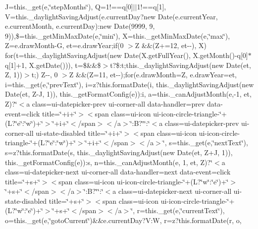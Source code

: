 {{\begin{DoxyParamCaption}
J=this.\+\_\+get(e,\char`\"{}step\+Months\char`\"{}), Q=1!==q\mbox{[}0\mbox{]}$\vert$$\vert$1!==q\mbox{[}1\mbox{]}, V=this.\+\_\+daylight\+Saving\+Adjust(e.\+current\+Day?new Date(e.\+current\+Year, e.\+current\+Month, e.\+current\+Day)\+:new Date(9999, 9, 9)),\$=this.\+\_\+get\+Min\+Max\+Date(e,\char`\"{}min\char`\"{}), X=this.\+\_\+get\+Min\+Max\+Date(e,\char`\"{}max\char`\"{}), Z=e.\+draw\+Month-\/\+G, et=e.\+draw\+Year;if(0 $>$\+Z \&\&(\+Z+=12, et-\/-\/), X) for(t=this.\+\_\+daylight\+Saving\+Adjust(new Date(\+X.\+get\+Full\+Year(), X.\+get\+Month()-\/q\mbox{[}0\mbox{]}$\ast$q\mbox{[}1\mbox{]}+1, X.\+get\+Date())), t=\$\&\&\$$>$t?\$\+:t;this.\+\_\+daylight\+Saving\+Adjust(new Date(et, Z, 1))$>$t;) Z-\/-\/, 0 $>$\+Z \&\&(\+Z=11, et-\/-\/);for(e.\+draw\+Month=\+Z, e.\+draw\+Year=et, i=this.\+\_\+get(e,\char`\"{}prev\+Text\char`\"{}), i=z?this.\+format\+Date(i, this.\+\_\+daylight\+Saving\+Adjust(new Date(et, Z-\/\+J, 1)), this.\+\_\+get\+Format\+Config(e))\+:i, a=this.\+\_\+can\+Adjust\+Month(e,-\/1, et, Z)?\char`\"{}$<$a class=\textquotesingle{}ui-\/datepicker-\/prev ui-\/corner-\/all\textquotesingle{} data-\/handler=\textquotesingle{}prev\textquotesingle{} data-\/event=\textquotesingle{}click\textquotesingle{} title=\textquotesingle{}\char`\"{}+i+\char`\"{}\textquotesingle{}$>$$<$span class=\textquotesingle{}ui-\/icon ui-\/icon-\/circle-\/triangle-\/\char`\"{}+(\+L?\char`\"{}e\char`\"{}\+:\char`\"{}w\char`\"{})+\char`\"{}\textquotesingle{}$>$\char`\"{}+i+\char`\"{}$<$/span$>$$<$/a$>$\char`\"{}\+:\+B?\char`\"{}\char`\"{}\+:\char`\"{}$<$a class=\textquotesingle{}ui-\/datepicker-\/prev ui-\/corner-\/all ui-\/state-\/disabled\textquotesingle{} title=\textquotesingle{}\char`\"{}+i+\char`\"{}\textquotesingle{}$>$$<$span class=\textquotesingle{}ui-\/icon ui-\/icon-\/circle-\/triangle-\/\char`\"{}+(\+L?\char`\"{}e\char`\"{}\+:\char`\"{}w\char`\"{})+\char`\"{}\textquotesingle{}$>$\char`\"{}+i+\char`\"{}$<$/span$>$$<$/a$>$\char`\"{}, s=this.\+\_\+get(e,\char`\"{}next\+Text\char`\"{}), s=z?this.\+format\+Date(s, this.\+\_\+daylight\+Saving\+Adjust(new Date(et, Z+\+J, 1)), this.\+\_\+get\+Format\+Config(e))\+:s, n=this.\+\_\+can\+Adjust\+Month(e, 1, et, Z)?\char`\"{}$<$a class=\textquotesingle{}ui-\/datepicker-\/next ui-\/corner-\/all\textquotesingle{} data-\/handler=\textquotesingle{}next\textquotesingle{} data-\/event=\textquotesingle{}click\textquotesingle{} title=\textquotesingle{}\char`\"{}+s+\char`\"{}\textquotesingle{}$>$$<$span class=\textquotesingle{}ui-\/icon ui-\/icon-\/circle-\/triangle-\/\char`\"{}+(\+L?\char`\"{}w\char`\"{}\+:\char`\"{}e\char`\"{})+\char`\"{}\textquotesingle{}$>$\char`\"{}+s+\char`\"{}$<$/span$>$$<$/a$>$\char`\"{}\+:\+B?\char`\"{}\char`\"{}\+:\char`\"{}$<$a class=\textquotesingle{}ui-\/datepicker-\/next ui-\/corner-\/all ui-\/state-\/disabled\textquotesingle{} title=\textquotesingle{}\char`\"{}+s+\char`\"{}\textquotesingle{}$>$$<$span class=\textquotesingle{}ui-\/icon ui-\/icon-\/circle-\/triangle-\/\char`\"{}+(\+L?\char`\"{}w\char`\"{}\+:\char`\"{}e\char`\"{})+\char`\"{}\textquotesingle{}$>$\char`\"{}+s+\char`\"{}$<$/span$>$$<$/a$>$\char`\"{}, r=this.\+\_\+get(e,\char`\"{}current\+Text\char`\"{}), o=this.\+\_\+get(e,\char`\"{}goto\+Current\char`\"{})\&\&e.\+current\+Day?\+V\+:\+W, r=z?this.\+format\+Date(r, o, 
\end{DoxyParamCaption}}}
